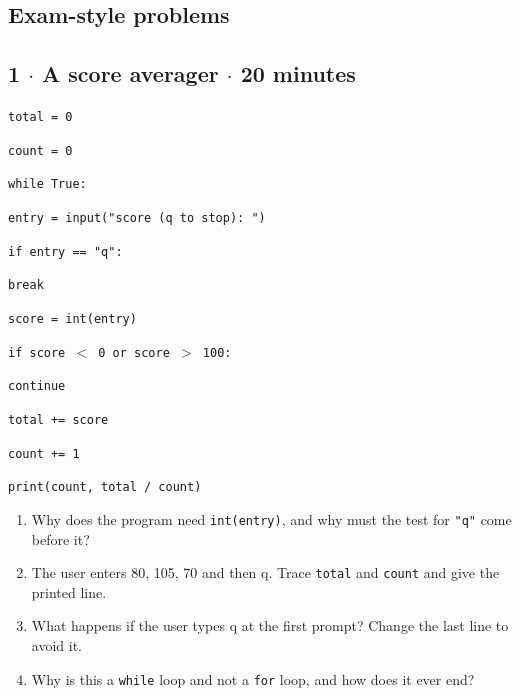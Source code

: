 \documentclass[11pt]{article}
\begin{document}
\begin{keepsection}
\section{Exam-style problems}

\begin{keepsection}
\subsection{1 \ensuremath{\cdot} A score averager \ensuremath{\cdot} 20 minutes}
\begin{tcolorbox}[colback=Paperblue,colframe=Paperblue,boxrule=0pt,arc=0pt,left=7pt,right=7pt,top=5pt,bottom=5pt]\small\sloppy
\noindent\hspace*{0em}\texttt{total = 0}\par
\noindent\hspace*{0em}\texttt{count = 0}\par
\noindent\hspace*{0em}\texttt{while True:}\par
\noindent\hspace*{1em}\texttt{entry = input("score (q to stop): ")}\par
\noindent\hspace*{1em}\texttt{if entry == "q":}\par
\noindent\hspace*{3em}\texttt{break}\par
\noindent\hspace*{1em}\texttt{score = int(entry)}\par
\noindent\hspace*{1em}\texttt{if score \ensuremath{<} 0 or score \ensuremath{>} 100:}\par
\noindent\hspace*{3em}\texttt{continue}\par
\noindent\hspace*{1em}\texttt{total += score}\par
\noindent\hspace*{1em}\texttt{count += 1}\par
\noindent\hspace*{0em}\texttt{print(count, total / count)}\par
\end{tcolorbox}

\begin{enumerate}
\item Why does the program need \texttt{int(entry)}, and why must the test for \texttt{"q"} come before it?
\item The user enters 80, 105, 70 and then q. Trace \texttt{total} and \texttt{count} and give the printed line.
\item What happens if the user types q at the first prompt? Change the last line to avoid it.
\item Why is this a \texttt{while} loop and not a \texttt{for} loop, and how does it ever end?
\end{enumerate}


\end{keepsection}
\end{keepsection}
\end{document}
